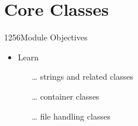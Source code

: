 %
%
%
%

\section{Core Classes}

\begin{slide}{1256}{Module Objectives}
\label{basic-types}

\begin{itemize}
\item Learn
\begin{itemize}
\item[\ldots] strings and related classes
\item[\ldots] container classes
\item[\ldots] file handling classes
\end{itemize}
\end{itemize}
\end{slide}






